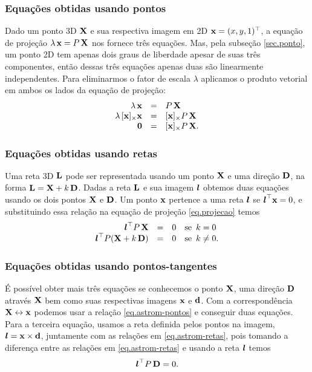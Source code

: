 \subsubsection*{Equações obtidas usando pontos}

Dado um ponto 3D $\mathbf{X}$ e sua respectiva imagem em 2D $\mathbf{x}=(x,y,1)^\top$, a equação de projeção $\lambda\,\mathbf{x}=P\,\mathbf{X}$ nos fornece três equações. Mas, pela subseção \ref{sec.ponto}, um ponto 2D tem apenas dois graus de liberdade apesar de suas três componentes, então dessas três equações apenas duas são linearmente independentes. Para eliminarmos o fator de escala $\lambda$ aplicamos o produto vetorial em ambos os lados da equação de projeção:
\begin{equation}\label{eq.astrom-pontos}
\begin{array}{rcl}
\lambda\,\mathbf{x}&=&P\,\mathbf{X}\\
\lambda\,[\mathbf{x}]_\times\mathbf{x}&=&[\mathbf{x}]_\times P\,\mathbf{X}\\
{\bf 0}&=&[\mathbf{x}]_\times P\,\mathbf{X}.
\end{array}
\end{equation}

\subsubsection*{Equações obtidas usando retas} 

Uma reta 3D ${\bf L}$ pode ser representada usando um ponto $\mathbf{X}$ e uma direção ${\bf D}$, na forma ${\bf L}=\mathbf{X}+k\,{\bf D}$. Dadas a reta ${\bf L}$ e sua imagem $\boldsymbol{l}$ obtemos duas equações usando os dois pontos $\mathbf{X}$ e ${\bf D}$. Um ponto $\mathbf{x}$ pertence a uma reta $\boldsymbol{l}$ se $\boldsymbol{l}^\top\mathbf{x}=0$, e substituindo essa relação na equação de projeção \ref{eq.projecao} temos
\begin{equation}\label{eq.astrom-retas}
\begin{array}{rcll}
\boldsymbol{l}^\top P\,\mathbf{X}&=&0&\text{se}\,\,\,k=0\\
\boldsymbol{l}^\top P(\mathbf{X}+k\,{\bf D})&=&0&\text{se}\,\,\,k\neq0.
\end{array}
\end{equation}  

\subsubsection*{Equações obtidas usando pontos-tangentes}

É possível obter mais três equações se conhecemos o ponto $\mathbf{X}$, uma direção ${\bf D}$ através $\mathbf{X}$ bem como suas respectivas imagens $\mathbf{x}$ e ${\bf d}$. Com a correspondência $\mathbf{X}\leftrightarrow\mathbf{x}$ podemos usar a relação \ref{eq.astrom-pontos} e conseguir duas equações. Para a terceira equação, usamos a reta definida pelos pontos na imagem, $\boldsymbol{l}=\mathbf{x}\times{\bf d}$, juntamente com as relações em \ref{eq.astrom-retas}, pois tomando a diferença entre as relações em \ref{eq.astrom-retas} e usando a reta $\boldsymbol{l}$ temos
\begin{equation}\label{eq.astrom-direcao}
\boldsymbol{l}^\top P\,{\bf D}=0.
\end{equation}  

